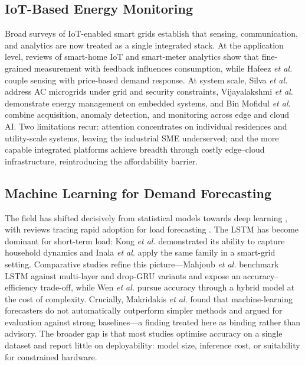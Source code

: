 \documentclass[conference]{IEEEtran}
\begin{document}
\subsection{IoT-Based Energy Monitoring}
Broad surveys of IoT-enabled smart grids
\cite{goudarzi2022survey} establish that sensing,
communication, and analytics are now treated as a single integrated stack. At
the application level, reviews of smart-home IoT \cite{alaa2017review} and
smart-meter analytics \cite{yildiz2017recent} show that fine-grained
measurement with feedback influences consumption, while Hafeez \textit{et al.}
\cite{hafeez2020efficient} couple sensing with price-based demand response.
At system scale, Silva
\textit{et al.} \cite{silva2023iot} address AC microgrids under grid and
security constraints, Vijayalakshmi \textit{et al.}
\cite{vijayalakshmi2023smart} demonstrate energy management on embedded
systems, and Bin Mofidul \textit{et al.} \cite{bin2022real} combine
acquisition, anomaly detection, and monitoring across edge and cloud AI. Two limitations recur: attention concentrates on individual residences and
utility-scale systems, leaving the industrial SME underserved; and the more
capable integrated platforms achieve breadth through costly edge--cloud
infrastructure, reintroducing the affordability barrier.
 
\subsection{Machine Learning for Demand Forecasting}
The field has shifted decisively from statistical models towards deep learning
\cite{lecun2015deep}, with reviews tracing
rapid adoption for load forecasting \cite{raza2015review}.
The LSTM \cite{hochreiter1997long} has become dominant for short-term load:
Kong \textit{et al.} \cite{kong2017short} demonstrated its ability to capture
household dynamics and Inala \textit{et al.} \cite{inala2025enhancing} apply
the same family in a smart-grid setting. Comparative studies refine this
picture---Mahjoub \textit{et al.} \cite{mahjoub2022predicting} benchmark LSTM
against multi-layer and drop-GRU variants and expose an accuracy--efficiency
trade-off, while Wen \textit{et al.} \cite{wen2024deep} pursue accuracy through
a hybrid model at the cost of complexity. Crucially, Makridakis \textit{et al.}
\cite{makridakis2018statistical} found that machine-learning forecasters do not
automatically outperform simpler methods and argued for evaluation against
strong baselines---a finding treated here as binding rather than advisory. The
broader gap is that most studies optimise accuracy on a single dataset and
report little on deployability: model size, inference cost, or suitability for
constrained hardware.
 
\end{document}
